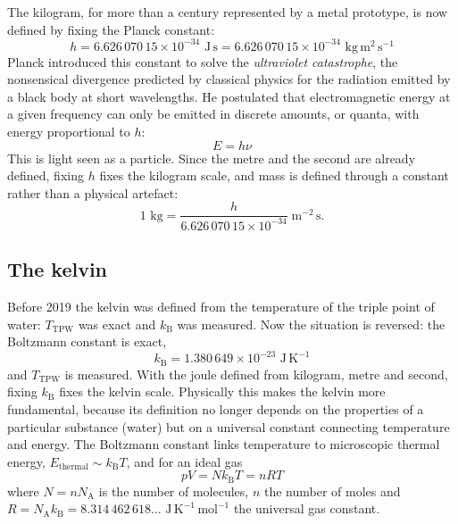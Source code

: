 \documentclass[letterpaper,11pt,leqno]{book}
\begin{document}
The kilogram, for more than a century represented by a metal prototype, is now defined by fixing the Planck constant:
\begin{equation}
\boxed{h = 6.626\,070\,15 \times 10^{-34}\text{ J}\,\text{s} = 6.626\,070\,15 \times 10^{-34}\text{ kg}\,\text{m}^2\,\text{s}^{-1}}
\label{eq:planck_def}
\end{equation}
Planck introduced this constant to solve the \emph{ultraviolet catastrophe}, the nonsensical divergence predicted by classical physics for the radiation emitted by a black body at short wavelengths. He postulated that electromagnetic energy at a given frequency can only be emitted in discrete amounts, or quanta, with energy proportional to $h$:
\begin{equation}
\boxed{E = h\nu}
\label{eq:planck_energy_quantum}
\end{equation}
This is light seen as a particle. Since the metre and the second are already defined, fixing $h$ fixes the kilogram scale, and mass is defined through a constant rather than a physical artefact:
\begin{equation}
1\text{ kg} = \frac{h}{6.626\,070\,15 \times 10^{-34}}\;\text{m}^{-2}\,\text{s}.
\label{eq:kilogram_inversion}
\end{equation}

\subsection{The kelvin}

Before 2019 the kelvin was defined from the temperature of the triple point of water: $T_{\text{TPW}}$ was exact and $k_{\text{B}}$ was measured. Now the situation is reversed: the Boltzmann constant is exact,
\begin{equation}
\boxed{k_{\text{B}} = 1.380\,649 \times 10^{-23}\text{ J}\,\text{K}^{-1}}
\label{eq:boltzmann_def}
\end{equation}
and $T_{\text{TPW}}$ is measured. With the joule defined from kilogram, metre and second, fixing $k_{\text{B}}$ fixes the kelvin scale. Physically this makes the kelvin more fundamental, because its definition no longer depends on the properties of a particular substance (water) but on a universal constant connecting temperature and energy. The Boltzmann constant links temperature to microscopic thermal energy, $E_{\text{thermal}} \sim k_{\text{B}}T$, and for an ideal gas
\begin{equation}
\boxed{pV = Nk_{\text{B}}T = nRT}
\label{eq:ideal_gas_laws}
\end{equation}
where $N = nN_{\text{A}}$ is the number of molecules, $n$ the number of moles and $R = N_{\text{A}}k_{\text{B}} = 8.314\,462\,618\ldots\text{ J}\,\text{K}^{-1}\,\text{mol}^{-1}$ the universal gas constant.
\end{document}
